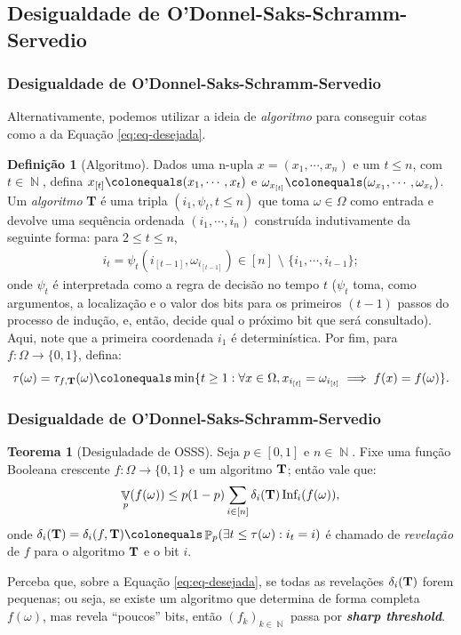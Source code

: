 \documentclass[9pt]{beamer}
\theoremstyle{definition} %
\newtheorem{mydef}{Definição}
\newtheorem{mythm}{Teorema}
\DeclareMathOperator{\PX}{\mathbb{P}} %
\DeclareMathOperator{\VX}{\mathbb{V}} %
\DeclareMathOperator{\NX}{\mathbb{N}} %
\newcommand{\infl}{\text{Inf}_i(f(\omega))}
\begin{document}
	\subsection{Desigualdade de O'Donnel-Saks-Schramm-Servedio}
	\begin{frame}[t]
		\frametitle{Desigualdade de O'Donnel-Saks-Schramm-Servedio}
		Alternativamente, podemos utilizar a ideia de \textit{algoritmo} para conseguir cotas como a da Equação \ref{eq:eq-desejada}.
		\begin{mydef}[Algoritmo]
				Dados uma n-upla $x = (x_1, \cdots, x_n)$ e um $t \leq n$, com $t \in \NX$, defina $x_{[t]} \colonequals (x_1, \cdots, x_t)$ e $\omega_{x_{[t]}} \colonequals (\omega_{x_1}, \cdots, \omega_{x_t})$. Um \textit{algoritmo} \textbf{T} é uma tripla $(i_1, \psi_t, t \leq n)$ que toma $\omega \in \Omega$ como entrada e devolve uma sequência ordenada $(i_1, \cdots, i_n)$ construída indutivamente da seguinte forma: para $2 \leq t \leq n$,
				\begin{align*}
					i_t = \psi_t(i_{[t-1]}, \omega_{i_{[t-1]}}) \in [n] \text{~\textbackslash~} \{i_1, \cdots, i_{t-1}\};
				\end{align*}
				onde $\psi_t$ é interpretada como a regra de decisão no tempo $t$ ($\psi_t$ toma, como argumentos, a localização e o valor dos bits para os primeiros $(t-1)$ passos do processo de indução, e, então, decide qual o próximo bit que será consultado). Aqui, note que a primeira coordenada $i_1$ é determinística. Por fim, para $f:\Omega \to \{0,1\}$, defina:
				\begin{align*}
					\tau(\omega) = \tau_{f, \text{\textbf{T}}}(\omega) \colonequals \min\{t \geq 1: \forall x \in \Omega, x_{i_{[t]}} = \omega_{i_{[t]}} \implies f(x) = f(\omega)\}.
				\end{align*}
		\end{mydef}
	\end{frame}

	\begin{frame}[t]
		\frametitle{Desigualdade de O'Donnel-Saks-Schramm-Servedio}	
		\begin{mythm}[Desiguladade de OSSS]\label{thm:osss}
			Seja $p \in [0,1]$ e $n \in \NX$. Fixe uma função Booleana crescente $f: \Omega \to \{0,1\}$ e um algoritmo $\text{\textbf{T}}$; então vale que:
			\begin{align*}
				\VX_p(f(\omega)) \leq p(1 - p) \sum_{i \in [n]} \delta_i(\text{\textbf{T}}) \, \infl, 
			\end{align*}
			onde $\delta_i(\text{\textbf{T}}) = \delta_i(f, \text{\textbf{T}}) \colonequals \PX_p(\exists t \leq \tau(\omega) : i_t = i)$ é chamado de \textit{revelação} de $f$ para o algoritmo $\text{\textbf{T}}$ e o bit $i$.
		\end{mythm}
		\vspace{-3pt}
		Perceba que, sobre a Equação \ref{eq:eq-desejada}, se todas as revelações $\delta_i(\text{\textbf{T}})$ forem pequenas; ou seja, se existe um algoritmo que determina de forma completa $f(\omega)$, mas revela ``poucos'' bits, então $(f_k)_{k \in \NX}$ passa por \textit{\textbf{sharp threshold}}.
		
	\end{frame}
\end{document}

